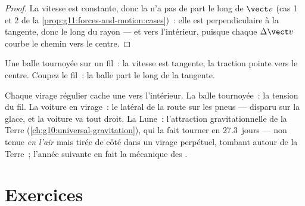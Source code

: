 \begin{proof}
La vitesse est constante, donc la
 n'a pas de part le long de
$\vect v$ (cas 1 et 2 de la
\cref{prop:g11:forces-and-motion:cases})~: elle est perpendiculaire à la
tangente, donc le long du rayon --- et vers l'intérieur, puisque chaque
$\Delta \vect v$ courbe le chemin vers le centre.
\end{proof}

\begin{omfigure}

{\small Une balle tournoyée sur un fil~: la vitesse est tangente, la
traction pointe vers le centre. Coupez le fil~: la balle part le long
de la tangente.}
\end{omfigure}

\begin{example}\label{ex:g11:forces-and-motion:moon}
Chaque virage régulier cache une
 vers l'intérieur. La balle tournoyée~:
la tension du fil. La voiture en virage~:
le  latéral de la route
sur les pneus --- disparu sur la glace, et la voiture va tout droit. La
Lune~: l'attraction gravitationnelle de la Terre
(\cref{ch:g10:universal-gravitation}), qui la fait tourner en
\num{27.3}~jours --- non tenue \emph{en l'air} mais tirée de côté dans
un virage perpétuel, tombant autour de la Terre~; l'année suivante en
fait la mécanique des
.
\end{example}

\section{Exercices}


